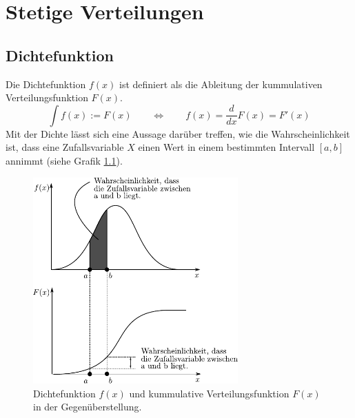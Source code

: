 \chapter{Stetige Verteilungen}
\newpage

\section{Dichtefunktion}
Die Dichtefunktion $f(x)$ ist definiert als die Ableitung der kummulativen
Verteilungsfunktion $F(x)$.
\[  
	\int f(x) := F(x) 
		\qquad 
		\Leftrightarrow 
		\qquad 
		f(x) = \frac{d}{dx} F(x)
		= F'(x)
\]
Mit der Dichte lässt sich eine Aussage darüber treffen, wie die 
Wahrscheinlichkeit ist, dass eine Zufallsvariable $X$ einen Wert
in einem bestimmten Intervall $[a,b]$ annimmt (siehe Grafik 
\ref{fig:dichte}).

\begin{figure}[h!]
	\centering
	\includegraphics[width=0.7\textwidth]{dichtefunktion.pdf}
	\caption{Dichtefunktion $f(x)$ und kummulative Verteilungsfunktion 
		$F(x)$ in der Gegenüberstellung.}
	\label{fig:dichte}
\end{figure}

